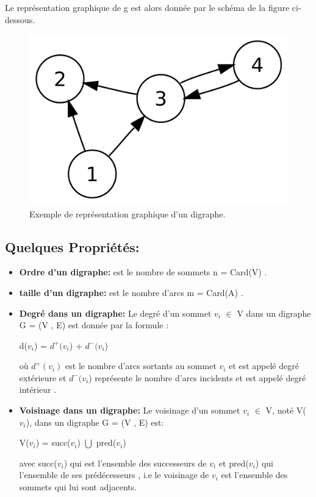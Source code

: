 		
		Le représentation graphique de g est alors donnée par le schéma de la figure ci-dessous.
		
		
			\begin{figure}[h]
			\includegraphics[scale=0.15,center]{./ressources/image/RepDiGraphe.png}
			\caption[Exemple de représentation graphique d'un digraphe.]{Exemple de représentation graphique d'un digraphe.}
			\end{figure}
			
		
		\subsection{Quelques Propriétés:} %
		
		\begin{itemize}
			\item \textbf{Ordre d'un digraphe:}
			est le nombre de sommets n = Card(V) \citep{DUT}.
			
			\item \textbf{taille d'un digraphe:} est le nombre d’arcs m = Card(A) \citep{DUT}.
			
			\item \textbf{Degré dans un digraphe:}
			Le degré d'un sommet $v_{i}$ $\in$ V dans un digraphe G = (V , E) est donnée par la formule :
			\begin{center}
				d($v_{i}$) = $d^+(v_{i}$) + $d^-(v_{i}$)
			\end{center}
				où $d^+(v_{i})$ est le nombre d'arcs sortants au sommet $v_{i}$ et est appelé degré extérieure et $d^-(v_{i}$) représente le nombre d'arcs incidents et est appelé degré intérieur \citep{muller}.
			 
			 \item \textbf{Voisinage dans un digraphe:}
			 Le voisinage d'un sommet $v_{i}$ $\in$ V, noté V($v_{i}$), dans un digraphe G = (V , E) est:\begin{center}
			 V($v_{i}$) = succ($v_{i}$) $\bigcup$ pred($v_{i}$) 
			 \end{center}
			avec succ($v_{i}$) qui est l'ensemble des successeurs de $v_{i}$ et pred($v_{i}$) qui l'ensemble de ses prédécesseurs \citep{bac}, i.e le voisinage de $v_{i}$ est l'ensemble des sommets qui lui sont adjacents.
				 
		\end{itemize}
		
			
			
			
			
			
			 
			 